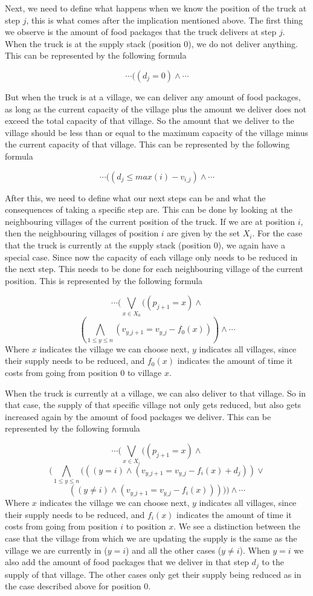 \documentclass[a4paper]{article}
\begin{document}
Next, we need to define what happens when we know the position of the truck at step $j$, this is what comes after the implication mentioned above. The first thing we observe is the amount of food packages that the truck delivers at step $j$. When the truck is at the supply stack (position 0), we do not deliver anything. This can be represented by the following formula

\[ \cdots ( (d_j = 0) \wedge \cdots \]

But when the truck is at a village, we can deliver any amount of food packages, as long as the current capacity of the village plus the amount we deliver does not exceed the total capacity of that village. So the amount that we deliver to the village should be less than or equal to the maximum capacity of the village minus the current capacity of that village. This can be represented by the following formula

\[ \cdots ( (d_j \leq max(i) - v_{i\_j}) \wedge \cdots \]

After this, we need to define what our next steps can be and what the consequences of taking a specific step are. This can be done by looking at the neighbouring villages of the current position of the truck. If we are at position $i$, then the neighbouring villages of position $i$ are given by the set $X_i$. For the case that the truck is currently at the supply stack (position 0), we again have a special case. Since now the capacity of each village only needs to be reduced in the next step. This needs to be done for each neighbouring village of the current position. This is represented by the following formula

\[ \cdots (\bigvee_{x \in X_0} ((p_{j+1} = x) \wedge \]
\[ (\bigwedge_{1 \leq y \leq n} (v_{y\_j+1} = v_{y\_j} - f_0(x))) \wedge \cdots \]
Where $x$ indicates the village we can choose next, $y$ indicates all villages, since their supply needs to be reduced, and $f_0(x)$ indicates the amount of time it costs from going from position 0 to village $x$.

When the truck is currently at a village, we can also deliver to that village. So in that case, the supply of that specific village not only gets reduced, but also gets increased again by the amount of food packages we deliver. This can be represented by the following formula

\[ \cdots (\bigvee_{x \in X_i} ((p_{j+1} = x) \wedge \]
\[ (\bigwedge_{1 \leq y \leq n} (((y=i) \wedge (v_{y\_j+1} = v_{y\_j} - f_i(x) + d_j)) \vee \]
\[ ((y \neq i) \wedge (v_{y\_j+1} = v_{y\_j} - f_i(x))))) \wedge \cdots \]
Where $x$ indicates the village we can choose next, $y$ indicates all villages, since their supply needs to be reduced, and $f_i(x)$ indicates the amount of time it costs from going from position $i$ to position $x$. We see a distinction between the case that the village from which we are updating the supply is the same as the village we are currently in ($y=i$) and all the other cases ($y \neq i$). When $y=i$ we also add the amount of food packages that we deliver in that step $d_j$ to the supply of that village. The other cases only get their supply being reduced as in the case described above for position 0.
\end{document}
